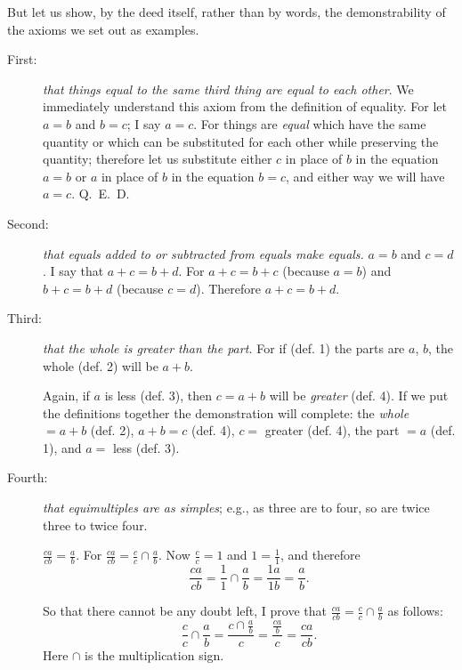 \documentclass[polutonikogreek,english,twoside,openright]{article}
\begin{document}
But let us show, by the deed itself, rather than by words, the demonstrability
of the axioms we set out as examples.
\begin{description}
\item[First:] {\em that things equal to the same third thing are equal to each
other}.  We immediately understand this axiom from the definition of equality.
For let $a=b$ and $b=c$; I say $a=c$.  For things are {\em equal} which have
the same quantity or which can be substituted for each other while preserving
the quantity; therefore let us substitute either $c$ in place of $b$ in the
equation $a=b$ or $a$ in place of $b$ in the equation $b=c$, and either way we
will have $a=c$.  Q.\ E.\ D.
\item[Second:] {\em that equals added to or subtracted from equals make
equals.}  $a=b$ and $c=d$. I say that $a+c= b+d$.  For $a+c = b+c$ (because
$a=b$) and $b+c = b+d$ (because $c=d$). Therefore $a+c = b+d$.
\item[Third:] {\em that the whole is greater than the part.}  For if (def. 1)
the parts are $a$, $b$, the whole (def. 2) will be $a+b$.
\begin{center}
\end{center}
Again, if $a$ is less (def. 3), then $c=a+b$ will be {\em greater} (def. 4).
If we put the definitions together the demonstration will complete: the
{\em whole} $= a + b$ (def. 2), $a + b = c$ (def. 4), $c =$ greater (def. 4),
the part $= a$ (def. 1), and $a = $ less (def. 3).

\item[Fourth:] {\em that equimultiples are as simples}; e.g., as three are to
four, so are twice three to twice four.

$\frac{ca}{cb} =\frac{a}{b}$. For $\frac{ca}{cb} = \frac{c}{c} \cap
\frac{a}{b}$.  Now $\frac{c}{c} = 1$ and $1 = \frac{1}{1}$, and therefore
$$\frac{ca}{cb} = \frac{1}{1} \cap \frac{a}{b} = \frac{1a}{1b} =
\frac{a}{b}.$$

So that there cannot be any doubt left, I prove that $\frac{ca}{cb} =
 \frac{c}{c} \cap \frac{a}{b}$ as follows:
$$\frac{c}{c} \cap \frac{a}{b} = \frac{c \cap \frac{a}{b}}{c} =
\frac{\frac{ca}{b}}{c} = \frac{ca}{cb}.$$ Here $\cap$ is the multiplication
sign.


\end{description}
\end{document}

